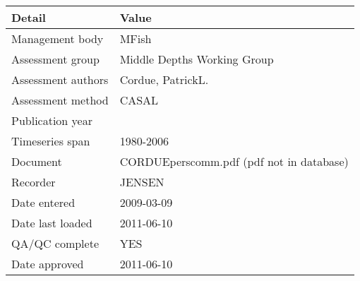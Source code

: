 \begin{table}[htb]
\centering
\begin{tabular}{ll}
\toprule
Detail & Value \\
\midrule
Management body    & MFish                                    \\
Assessment group   & Middle Depths Working Group              \\
Assessment authors & Cordue, PatrickL.                        \\
Assessment method  & CASAL                                    \\
Publication year   &                                          \\
Timeseries span    & 1980-2006                                \\
Document           & CORDUEperscomm.pdf (pdf not in database) \\
Recorder           & JENSEN                                   \\
Date entered       & 2009-03-09                               \\
Date last loaded   & 2011-06-10                               \\
QA/QC complete     & YES                                      \\
Date approved      & 2011-06-10                               \\
\bottomrule
\end{tabular}
\label{tab:assessdet}
\end{table}
